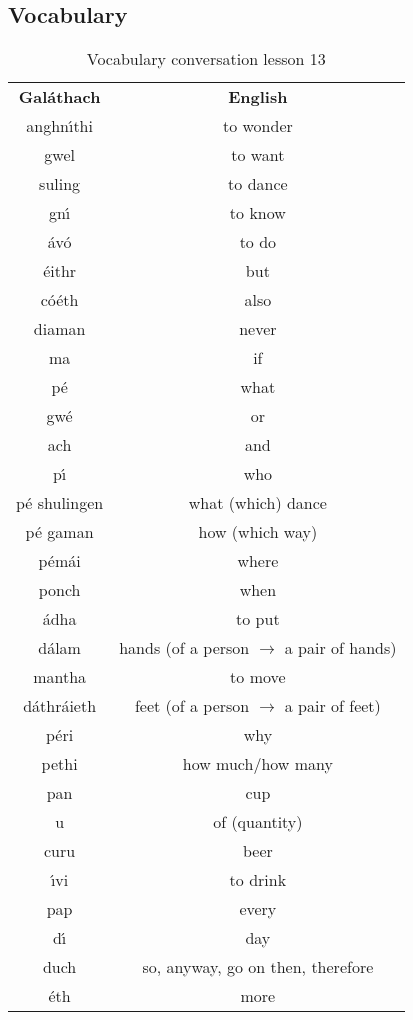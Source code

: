 \subsection{Vocabulary}

\begin{table}[H]
\centering
\begin{tabular}{cc}
  \toprule
  \textbf{Gal\'{a}thach} & \textbf{English}\\
  \cmidrule(lr){1-1}\cmidrule(lr){2-2}
  anghn\'{\i}thi & to wonder\\
  gwel & to want\\
  suling & to dance\\
  gn\'{\i} & to know\\
  \'{a}v\'{o} & to do\\
  \'{e}ithr & but\\
  c\'{o}\'{e}th & also\\
  diaman & never\\
  ma & if\\
  p\'{e} & what\\
  gw\'{e} & or\\
  ach & and\\
  p\'{\i} & who\\
  p\'{e} shulingen & what (which) dance\\
  p\'{e} gaman & how (which way)\\
  p\'{e}m\'{a}i & where\\
  ponch & when\\
  \'{a}dha & to put\\
  d\'{a}lam & hands (of a person $\rightarrow$ a pair of hands)\\
  mantha & to move\\
  d\'{a}thr\'{a}ieth & feet (of a person $\rightarrow$ a pair of feet)\\
  p\'{e}ri & why\\
  pethi & how much/how many\\
  pan & cup\\
  u & of (quantity)\\
  curu & beer\\
  \'{\i}vi & to drink\\
  pap & every\\
  d\'{\i} & day\\
  duch & so, anyway, go on then, therefore\\
  \'{e}th & more\\
  \bottomrule
\end{tabular}
\label{vocab_conversation_lesson13}
\caption{Vocabulary conversation lesson 13}
\end{table}

